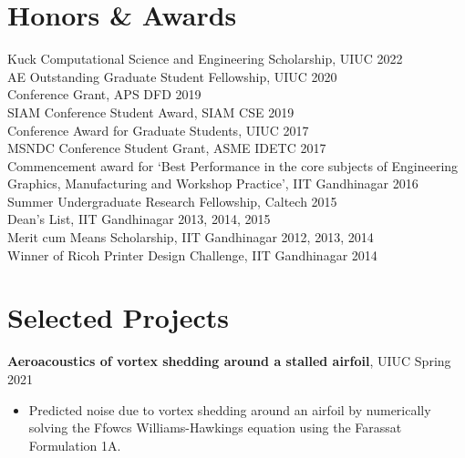 \documentclass[margin]{res}
\begin{document}
\begin{resume}
\section{\large Honors \& Awards}
Kuck Computational Science and Engineering Scholarship, UIUC \hfill 2022\vspace{0.1cm}\\
AE Outstanding Graduate Student Fellowship, UIUC \hfill 2020\vspace{0.1cm}\\
Conference Grant, APS DFD \hfill 2019\vspace{0.1cm}\\
SIAM Conference Student Award, SIAM CSE \hfill 2019\vspace{0.1cm}\\
Conference Award for Graduate Students, UIUC \hfill 2017\vspace{0.1cm}\\
MSNDC Conference Student Grant, ASME IDETC \hfill 2017\vspace{0.1cm}\\
Commencement award for `Best Performance in the core subjects of Engineering Graphics, Manufacturing and Workshop Practice', IIT Gandhinagar \hfill 2016\vspace{0.1cm}\\
Summer Undergraduate Research Fellowship, Caltech \hfill 2015\vspace{0.1cm}\\
Dean's List, IIT Gandhinagar \hfill 2013, 2014, 2015\vspace{0.1cm}\\
Merit cum Means Scholarship, IIT Gandhinagar \hfill 2012, 2013, 2014\vspace{0.1cm}\\
Winner of Ricoh Printer Design Challenge, IIT Gandhinagar \hfill 2014


\section{\large Selected Projects}

{\bf Aeroacoustics of vortex shedding around a stalled airfoil}, UIUC \hfill Spring 2021
\begin{itemize}
\item Predicted noise due to vortex shedding around an airfoil by numerically solving the Ffowcs Williams-Hawkings equation using the Farassat Formulation 1A.
\end{itemize}


\end{resume}
\end{document}
